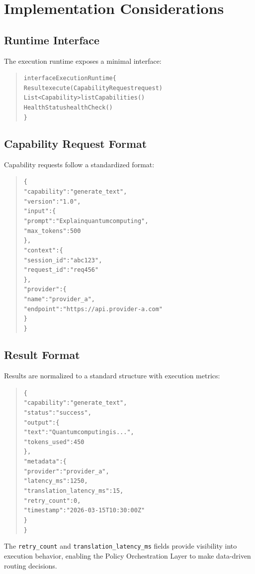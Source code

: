 \section{Implementation Considerations}

\subsection{Runtime Interface}

The execution runtime exposes a minimal interface:

\begin{quote}
\small
\begin{alltt}
interface ExecutionRuntime \{
    Result execute(CapabilityRequest request)
    List<Capability> listCapabilities()
    HealthStatus healthCheck()
\}
\end{alltt}
\end{quote}

\subsection{Capability Request Format}

Capability requests follow a standardized format:

\begin{quote}
\small
\begin{alltt}
\{
  "capability": "generate\_text",
  "version": "1.0",
  "input": \{
    "prompt": "Explain quantum computing",
    "max\_tokens": 500
  \},
  "context": \{
    "session\_id": "abc123",
    "request\_id": "req456"
  \},
  "provider": \{
    "name": "provider\_a",
    "endpoint": "https://api.provider-a.com"
  \}
\}
\end{alltt}
\end{quote}

\subsection{Result Format}

Results are normalized to a standard structure with execution metrics:

\begin{quote}
\small
\begin{alltt}
\{
  "capability": "generate\_text",
  "status": "success",
  "output": \{
    "text": "Quantum computing is...",
    "tokens\_used": 450
  \},
  "metadata": \{
    "provider": "provider\_a",
    "latency\_ms": 1250,
    "translation\_latency\_ms": 15,
    "retry\_count": 0,
    "timestamp": "2026-03-15T10:30:00Z"
  \}
\}
\end{alltt}
\end{quote}

The \texttt{retry\_count} and \texttt{translation\_latency\_ms} fields provide visibility into execution behavior, enabling the Policy Orchestration Layer to make data-driven routing decisions.
